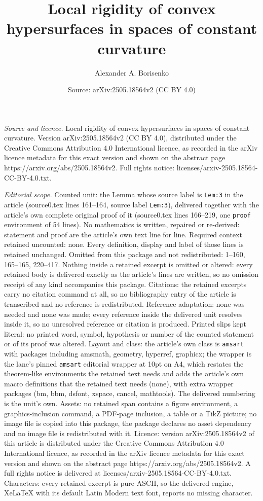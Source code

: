 \documentclass[10pt,a4paper]{amsart}
\title[Local rigidity of convex hypersurfaces in spaces of constant]{Local rigidity of convex hypersurfaces in spaces of constant curvature}
\author{Alexander A. Borisenko}
\date{Source: arXiv:2505.18564v2 (CC BY 4.0)}
\begin{document}
\maketitle

\noindent\emph{Source and licence.} Local rigidity of convex hypersurfaces in spaces of constant curvature. Version arXiv:2505.18564v2 (CC BY 4.0), distributed under the Creative Commons Attribution 4.0 International licence, as recorded in the arXiv licence metadata for this exact version and shown on the abstract page https://arxiv.org/abs/2505.18564v2. Full rights notice: licenses/arxiv-2505.18564-CC-BY-4.0.txt.\par\smallskip

\noindent\textit{Editorial scope.} Counted unit: the Lemma whose source label is \texttt{Lem:3} in the article (source0.tex lines 161--164, source label \texttt{Lem:3}), delivered together with the article's own complete original proof of it (source0.tex lines 166--219, one \texttt{proof} environment of 54 lines). No mathematics is written, repaired or re-derived: statement and proof are the article's own text line for line. Required context retained uncounted: none. Every definition, display and label of those lines is retained unchanged. Omitted from this package and not redistributed: 1--160, 165--165, 220--417. Nothing inside a retained excerpt is omitted or altered: every retained body is delivered exactly as the article's lines are written, so no omission receipt of any kind accompanies this package. Citations: the retained excerpts carry no citation command at all, so no bibliography entry of the article is transcribed and no reference is redistributed. Reference adaptation: none was needed and none was made; every reference inside the delivered unit resolves inside it, so no unresolved reference or citation is produced. Printed slips kept literal: no printed word, symbol, hypothesis or number of the counted statement or of its proof was altered. Layout and class: the article's own class is \texttt{amsart} with packages including amsmath, geometry, hyperref, graphicx; the wrapper is the lane's pinned \texttt{amsart} editorial wrapper at 10pt on A4, which restates the theorem-like environments the retained text needs and adds the article's own macro definitions that the retained text needs (none), with extra wrapper packages (bm, bbm, dsfont, xspace, cancel, mathtools). The delivered numbering is the unit's own. Assets: no retained span contains a figure environment, a graphics-inclusion command, a PDF-page inclusion, a table or a TikZ picture; no image file is copied into this package, the package declares no asset dependency and no image file is redistributed with it. Licence: version arXiv:2505.18564v2 of this article is distributed under the Creative Commons Attribution 4.0 International licence, as recorded in the arXiv licence metadata for this exact version and shown on the abstract page https://arxiv.org/abs/2505.18564v2. A full rights notice is delivered at licenses/arxiv-2505.18564-CC-BY-4.0.txt. Characters: every retained excerpt is pure ASCII, so the delivered engine, XeLaTeX with its default Latin Modern text font, reports no missing character.
\end{document}

